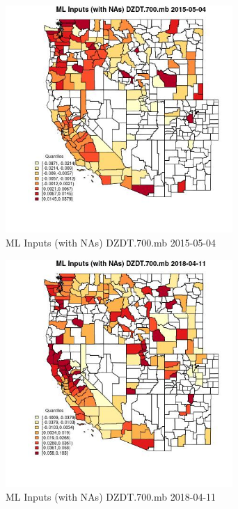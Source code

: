 \begin{figure} 
\centering  
\includegraphics[width=0.77\textwidth]{Code_Outputs/Report_ML_input_PM25_Step4_part_e_de_duplicated_aves_compiled_2019-05-18wNAs_CountyDZDT700mbMean2015-05-04_2015-05-04.jpg} 
\caption{\label{fig:Report_ML_input_PM25_Step4_part_e_de_duplicated_aves_compiled_2019-05-18wNAsCountyDZDT700mbMean2015-05-04_2015-05-04}ML Inputs (with NAs) DZDT.700.mb 2015-05-04} 
\end{figure} 
 

\clearpage 

\begin{figure} 
\centering  
\includegraphics[width=0.77\textwidth]{Code_Outputs/Report_ML_input_PM25_Step4_part_e_de_duplicated_aves_compiled_2019-05-18wNAs_CountyDZDT700mbMean2018-04-11_2018-04-11.jpg} 
\caption{\label{fig:Report_ML_input_PM25_Step4_part_e_de_duplicated_aves_compiled_2019-05-18wNAsCountyDZDT700mbMean2018-04-11_2018-04-11}ML Inputs (with NAs) DZDT.700.mb 2018-04-11} 
\end{figure} 
 

